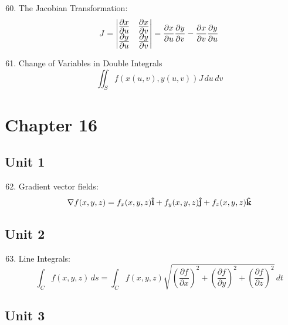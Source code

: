 \documentclass[12pt]{article}
\begin{document}
\begin{enumerate}
    \setcounter{enumi}{59}

  \item The Jacobian Transformation:
    $$J=\Large{\begin{vmatrix} \frac{\partial x}{\partial u} & \frac{\partial x}{\partial v} \\ \frac{\partial y}{\partial u} & \frac{\partial y}{\partial v} \\ \end{vmatrix}}=\frac{\partial x}{\partial u}\frac{\partial y}{\partial v}-\frac{\partial x}{\partial v}\frac{\partial y}{\partial u}$$

  \item Change of Variables in Double Integrals
    $$\iint_S f(x(u,v),y(u,v)) J\,du\,dv$$

\end{enumerate}

\section{Chapter 16}

\subsection{Unit 1}

\begin{enumerate}
    \setcounter{enumi}{61}

  \item Gradient vector fields:
    $$\nabla f(x,y,z)=f_x(x,y,z)\bold{\hat{i}}+f_y(x,y,z)\bold{\hat{j}}+f_z(x,y,z)\bold{\hat{k}}$$

\end{enumerate}

\subsection{Unit 2}

\begin{enumerate}
    \setcounter{enumi}{62}

  \item Line Integrals:
    $$\int_C f(x,y,z)\,ds=\int_C f(x,y,z)\sqrt{\left(\frac{\partial f}{\partial x}\right)^2+\left(\frac{\partial f}{\partial y}\right)^2+\left(\frac{\partial f}{\partial z}\right)^2}\,dt$$

\end{enumerate}

\subsection{Unit 3}
\end{document}
